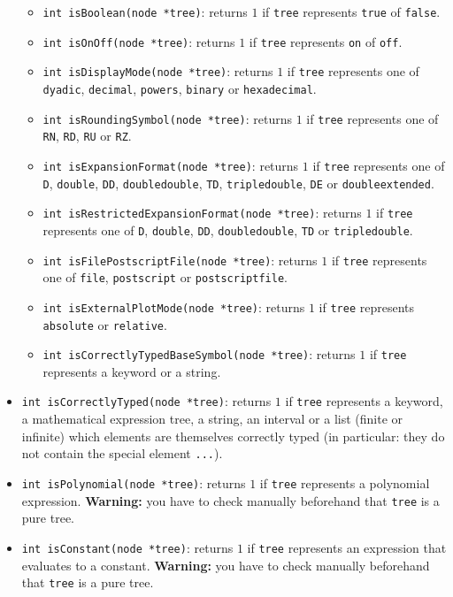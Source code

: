 \documentclass{article}
\begin{document}
\begin{itemize}
\begin{itemize}
  \item \texttt{int isBoolean(node *tree)}: returns $1$ if
    \texttt{tree} represents \texttt{true} of \texttt{false}.
  \item \texttt{int isOnOff(node *tree)}: returns $1$ if \texttt{tree}
    represents \texttt{on} of \texttt{off}.
  \item \texttt{int isDisplayMode(node *tree)}: returns $1$ if
    \texttt{tree} represents one of \texttt{dyadic}, \texttt{decimal},
    \texttt{powers}, \texttt{binary} or \texttt{hexadecimal}.
  \item \texttt{int isRoundingSymbol(node *tree)}: returns $1$ if
    \texttt{tree} represents one of \texttt{RN}, \texttt{RD},
    \texttt{RU} or \texttt{RZ}.
  \item \texttt{int isExpansionFormat(node *tree)}: returns $1$ if
    \texttt{tree} represents one of \texttt{D}, \texttt{double},
    \texttt{DD}, \texttt{doubledouble}, \texttt{TD},
    \texttt{tripledouble}, \texttt{DE} or \texttt{doubleextended}.
  \item \texttt{int isRestrictedExpansionFormat(node *tree)}: returns
    $1$ if \texttt{tree} represents one of \texttt{D},
    \texttt{double}, \texttt{DD}, \texttt{doubledouble}, \texttt{TD}
    or \texttt{tripledouble}.
  \item \texttt{int isFilePostscriptFile(node *tree)}: returns $1$ if
    \texttt{tree} represents one of \texttt{file}, \texttt{postscript}
    or \texttt{postscriptfile}.
  \item \texttt{int isExternalPlotMode(node *tree)}: returns $1$ if
    \texttt{tree} represents \texttt{absolute} or \texttt{relative}.
  \item \texttt{int isCorrectlyTypedBaseSymbol(node *tree)}: returns $1$ if \texttt{tree} represents a keyword or a string.
  \end{itemize}
\item \texttt{int isCorrectlyTyped(node *tree)}: returns $1$ if \texttt{tree} represents a keyword, a mathematical expression tree, a string, an interval or a list (finite or infinite) which elements are themselves correctly typed (in particular: they do not contain the special element \texttt{...}).
\item \texttt{int isPolynomial(node *tree)}: returns $1$ if \texttt{tree} represents a polynomial expression. \textbf{Warning: }you have to check manually beforehand that \texttt{tree} is a pure tree.
\item \texttt{int isConstant(node *tree)}: returns $1$ if \texttt{tree} represents an expression that evaluates to a constant. \textbf{Warning: }you have to check manually beforehand that \texttt{tree} is a pure tree.

\end{itemize}
\end{document}
